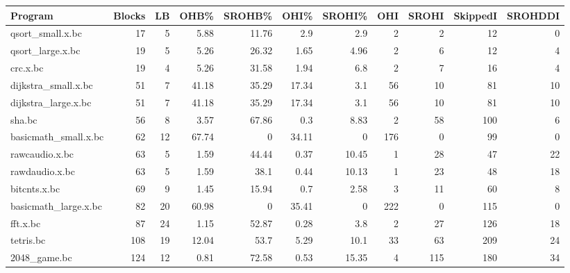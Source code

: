 \begin{tabular}{|l|r|r|r|r|r|r|r|r|r|r|}
\hline
 Program              &   Blocks &   LB &   OHB\% &   SROHB\% &   OHI\% &   SROHI\% &   OHI &   SROHI &   SkippedI &   SROHDDI \\
\hline
 qsort\_small.x.bc     &       17 &    5 &   5.88 &    11.76 &   2.9  &     2.9  &     2 &       2 &         12 &         0 \\
\hline
 qsort\_large.x.bc     &       19 &    5 &   5.26 &    26.32 &   1.65 &     4.96 &     2 &       6 &         12 &         4 \\
\hline
 crc.x.bc             &       19 &    4 &   5.26 &    31.58 &   1.94 &     6.8  &     2 &       7 &         16 &         4 \\
\hline
 dijkstra\_small.x.bc  &       51 &    7 &  41.18 &    35.29 &  17.34 &     3.1  &    56 &      10 &         81 &        10 \\
\hline
 dijkstra\_large.x.bc  &       51 &    7 &  41.18 &    35.29 &  17.34 &     3.1  &    56 &      10 &         81 &        10 \\
\hline
 sha.bc               &       56 &    8 &   3.57 &    67.86 &   0.3  &     8.83 &     2 &      58 &        100 &         6 \\
\hline
 basicmath\_small.x.bc &       62 &   12 &  67.74 &     0    &  34.11 &     0    &   176 &       0 &         99 &         0 \\
\hline
 rawcaudio.x.bc       &       63 &    5 &   1.59 &    44.44 &   0.37 &    10.45 &     1 &      28 &         47 &        22 \\
\hline
 rawdaudio.x.bc       &       63 &    5 &   1.59 &    38.1  &   0.44 &    10.13 &     1 &      23 &         48 &        18 \\
\hline
 bitcnts.x.bc         &       69 &    9 &   1.45 &    15.94 &   0.7  &     2.58 &     3 &      11 &         60 &         8 \\
\hline
 basicmath\_large.x.bc &       82 &   20 &  60.98 &     0    &  35.41 &     0    &   222 &       0 &        115 &         0 \\
\hline
 fft.x.bc             &       87 &   24 &   1.15 &    52.87 &   0.28 &     3.8  &     2 &      27 &        126 &        18 \\
\hline
 tetris.bc            &      108 &   19 &  12.04 &    53.7  &   5.29 &    10.1  &    33 &      63 &        209 &        24 \\
\hline
 2048\_game.bc         &      124 &   12 &   0.81 &    72.58 &   0.53 &    15.35 &     4 &     115 &        180 &        34 \\

\end{tabular}
